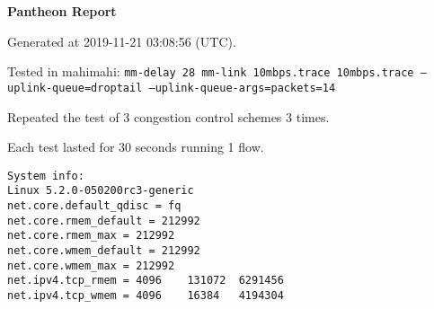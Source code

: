 \documentclass{article}
\begin{document}
\centerline{\textbf{\large{Pantheon Report}}}
\vspace{20pt}

Generated at 2019-11-21 03:08:56 (UTC).

Tested in mahimahi: \texttt{mm-delay 28 mm-link 10mbps.trace 10mbps.trace --uplink-queue=droptail --uplink-queue-args=packets=14}

Repeated the test of 3 congestion control schemes 3 times.

Each test lasted for 30 seconds running 1 flow.

\begin{verbatim}
System info:
Linux 5.2.0-050200rc3-generic
net.core.default_qdisc = fq
net.core.rmem_default = 212992
net.core.rmem_max = 212992
net.core.wmem_default = 212992
net.core.wmem_max = 212992
net.ipv4.tcp_rmem = 4096	131072	6291456
net.ipv4.tcp_wmem = 4096	16384	4194304
\end{verbatim}
\end{document}
